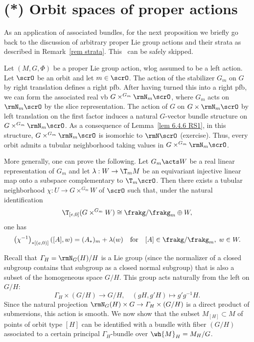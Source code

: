 \section{(*) Orbit spaces of proper actions}

As an application of associated bundles, for the next proposition we briefly go back to the discussion of arbitrary proper Lie group actions and their strata as described in Remark~\ref{rem strata}. This \sect\ can be safely skipped.

\begin{rem}[{{\cite[Rem.~6.5.8]{RS1}}}]\label{rem 6.5.8 RS1}
    Let $(M,G,\Phi)$ be a proper Lie group action, \gls{wlog} assumed to be a left action. Let $\scrO$ be an orbit and let $m\in\scrO$. The action of the stabilizer $G_m$ on $G$ by right translation defines a right \gls{pfb}. After having turned this into a right \gls{pfb}, we can form the associated real \gls{vb} $G\times^{G_m}\rmN_m\scrO$, where $G_m$ acts on $\rmN_m\scrO$ by the slice representation. The action of $G$ on $G\times\rmN_m\scrO$ by left translation on the first factor induces a natural $G$-vector bundle structure on $G\times^{G_m}\rmN_m\scrO$. As a consequence of Lemma~\ref{lem 6.4.6 RS1}, in this structure,  $G\times^{G_m}\rmN_m\scrO$ is isomorhic to $\rmN\scrO$ (exercise). Thus, every orbit admits a tubular neighborhood taking values in $G\times^{G_m}\rmN_m\scrO$.

    More generally, one can prove the following. Let $G_m\acts W$ be a real linear representation of $G_m$ and let $\lambda:W\to \T_m M$ be an equivariant injective linear map onto a subspace complementary to $\T_m\scrO$. Then there exists a tubular neighborhood $\chi:U\to G\times^{G_m}W$ of $\scrO$ such that, under the natural identification 
    \[\T_{[e,0]}(G\times^{G_m}W)\cong \frakg\slash\frakg_m\oplus W,\]
    one has 
    \[\left(\chi^{-1}\right)_{\ast[(e,0)]}\left([A],w\right)=(A_\ast)_m+\lambda(w)\quad\text{for}\quad  [A]\in\frakg\slash\frakg_m,\; w\in W.\]
\end{rem}

Recall that $\varGamma_H=\rmN_G(H)\slash H$ is a Lie group (since the normalizer of a closed subgroup contains that subgroup as a closed normal subgroup) that is also a subset of the homogeneous space $G\slash H$. This group acts naturally from the left on $G\slash H$:
\[\varGamma_H\times (G\slash H)\to G\slash H,\quad (gH,g'H)\mapsto g'g^{-1}H.\]
Since the natural projection $\rmN_G(H)\times G\to \varGamma_H\times (G\slash H)$ is a direct product of submersions, this action is smooth. We now show that the subset $M_{[H]}\subset M$ of points of orbit type $[H]$ can be identified with a bundle with fiber $(G\slash H)$ associated to a certain principal $\varGamma_H$-bundle over $\wh{M}_H=M_H\slash G$.

